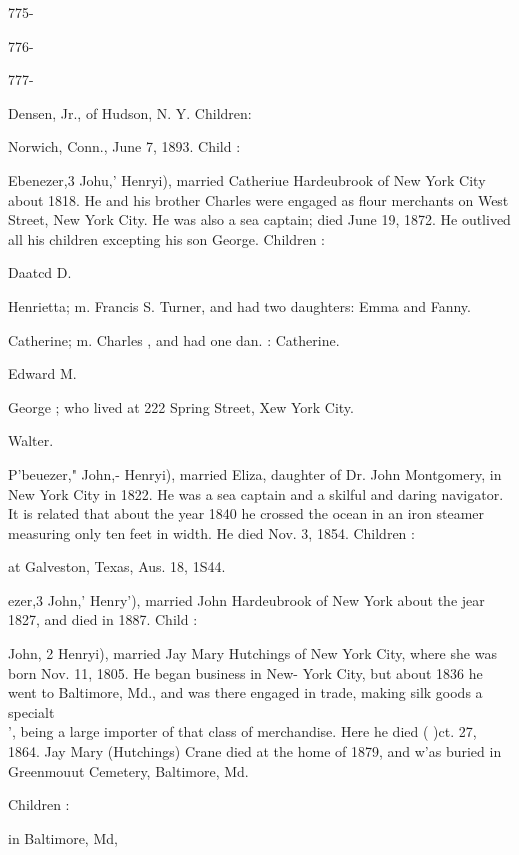 \documentclass[oneside]{book}
\begin{document}
775- 




776- 




777- 









Densen, Jr., of Hudson, N. Y. Children: 




Norwich, Conn., June 7, 1893. Child : 

Ebenezer,3 Johu,' Henryi), married Catheriue Hardeubrook of 
New York City about 1818. He and his brother Charles were 
engaged as flour merchants on West Street, New York City. He 
was also a sea captain; died June 19, 1872. He outlived all his 
children excepting his son George. Children : 

Daatcd D. 

Henrietta; m. Francis S. Turner, and had two daughters: 
Emma and Fanny. 

Catherine; m. Charles , and had one dan. : Catherine. 

Edward M. 

George ; who lived at 222 Spring Street, Xew York City. 

Walter. 

P'beuezer," John,- Henryi), married Eliza, daughter of Dr. John 
Montgomery, in New York City in 1822. He was a sea captain 
and a skilful and daring navigator. It is related that about the 
year 1840 he crossed the ocean in an iron steamer measuring only 
ten feet in width. He died Nov. 3, 1854. Children : 



at Galveston, Texas, Aus. 18, 1S44. 

ezer,3 John,' Henry'), married John Hardeubrook of New York 
about the jear 1827, and died in 1887. Child : 


John, 2 Henryi), married Jay Mary Hutchings of New York City, 
where she was born Nov. 11, 1805. He began business in New- 
York City, but about 1836 he went to Baltimore, Md., and was 
there engaged in trade, making silk goods a specialt\\', being a 
large importer of that class of merchandise. Here he died ( )ct. 
27, 1864. Jay Mary (Hutchings) Crane died at the home of 
1879, and w'as buried in Greenmouut Cemetery, Baltimore, Md. 

Children : 

in Baltimore, Md, 
\end{document}
